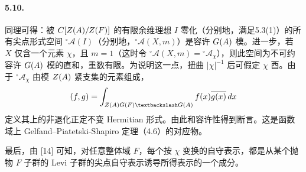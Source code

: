 \paragraph*{5.10.}
同理可得：被 $C[Z(A)/Z(F)]$ 的有限余维理想 $I$ 零化（分别地，满足5.3(1)）的所有尖点形式空间 $^\circ\mathcal A(I)$（分别地，$^\circ\mathcal A(X,m)$）是容许 $G(A)$ 模。进一步，若 $X$ 仅含一个元素 $\chi$，且 $m=1$（这时令 $^\circ\mathcal A(X,m)={}^\circ\mathcal A_\chi$），则此空间为不可约容许 $G(A)$ 模的直和，重数有限。为说明这一点，扭曲 $|\chi|^{-1}$ 后可假定 $\chi$ 酉。由于 $^\circ\mathcal A_\chi$ 由模 $Z(A)$ 紧支集的元素组成，
\[
(f,g)=\int_{Z(\A)G(F)\backslash G(\A)}f(x)\overline{g(x)}\,dx
\]
定义其上的非退化正定不变 Hermitian 形式。由此和容许性得到断言。这是函数域上 Gelfand--Piatetski-Shapiro 定理（4.6）的对应物。

最后，由 [14] 可知，对任意整体域 $F$，每个按 $\chi$ 变换的自守表示，都是从某个抛物 $F$ 子群的 Levi 子群的尖点自守表示诱导所得表示的一个成分。

